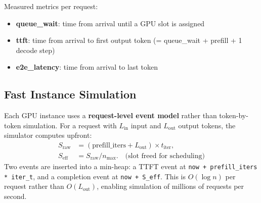 \documentclass[11pt,a4paper]{article}
\begin{document}
\begin{center}
\end{center}

Measured metrics per request:
\begin{itemize}[nosep]
  \item \textbf{queue\_wait}: time from arrival until a GPU slot is
    assigned
  \item \textbf{ttft}: time from arrival to first output token
    (= queue\_wait + prefill + 1 decode step)
  \item \textbf{e2e\_latency}: time from arrival to last token
\end{itemize}

\subsection{Fast Instance Simulation}

Each GPU instance uses a \textbf{request-level event model} rather
than token-by-token simulation.  For a request with $L_{\text{in}}$
input and $L_{\text{out}}$ output tokens, the simulator computes
upfront:
\begin{align}
  S_{\text{raw}} &= (\text{prefill\_iters} + L_{\text{out}}) \times t_{\text{iter}},\\
  S_{\text{eff}} &= S_{\text{raw}} / n_{\max}.  \quad \text{(slot freed for scheduling)}
\end{align}
Two events are inserted into a min-heap: a TTFT event at
\texttt{now + prefill\_iters * iter\_t}, and a completion event at
\texttt{now + S\_eff}.  This is $O(\log n)$ per request rather than
$O(L_{\text{out}})$, enabling simulation of millions of requests per
second.
\end{document}
